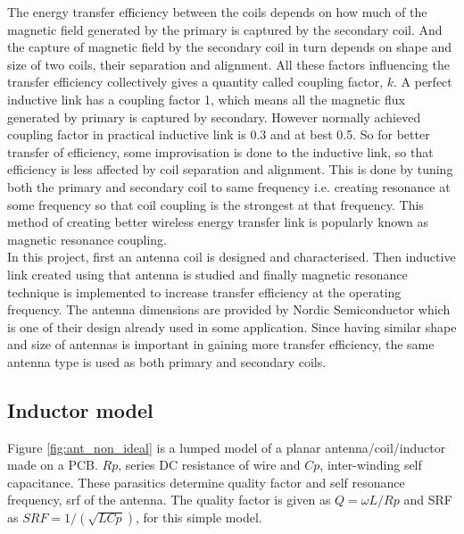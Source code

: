 \documentclass[12pt,a4paper,UKenglish]{article}
\begin{document}
The energy transfer efficiency between the coils depends on how much of the magnetic field generated by the primary is captured 
by the secondary coil. And the capture of magnetic field by the secondary coil in turn depends on shape and size of two coils, 
their separation and alignment. All these factors influencing the transfer efficiency collectively gives a quantity called 
coupling factor, $k$. A perfect inductive link has a coupling factor 1, which means all the magnetic flux generated by primary 
is captured by secondary. However normally achieved coupling factor in practical inductive link is 0.3 and at best 0.5. So 
for better transfer of efficiency, some improvisation is done to the inductive link, so that efficiency is less affected by 
coil separation and alignment. This is done by tuning both the primary and secondary coil to same frequency i.e. creating 
resonance at some frequency so that coil coupling is the strongest at that frequency. This method of creating better wireless 
energy transfer link is popularly known as magnetic resonance coupling.\\ 

In this project, first an antenna coil is designed and characterised. Then inductive link created using that antenna is studied 
and finally magnetic resonance technique is implemented to increase transfer efficiency at the operating frequency. The antenna 
dimensions are provided by Nordic Semiconductor which is one of their design already used in some application. Since having 
similar shape and size of antennas is important in gaining more transfer efficiency, the same antenna type is used as both 
primary and secondary coils. \\

\subsection{Inductor model}

Figure \ref{fig:ant_non_ideal} is a lumped model of a planar antenna/coil/inductor made on a PCB. $Rp$, series DC resistance of wire and $Cp$, 
inter-winding self capacitance. These parasitics determine quality factor and self resonance frequency, \acrshort{srf} of 
the antenna. The quality factor is given as $Q = \omega L/Rp$ and SRF as $SRF = 1/(\sqrt{LCp})$, for this simple model. \\
\end{document}
